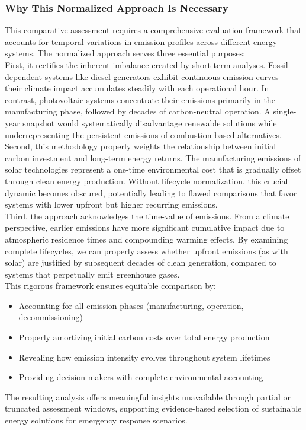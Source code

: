 \documentclass{article}
\begin{document}
\subsubsection*{Why This Normalized Approach Is Necessary}
This comparative assessment requires a comprehensive evaluation framework that accounts for temporal variations in emission profiles across different energy systems. The normalized approach serves three essential purposes:\\
First, it rectifies the inherent imbalance created by short-term analyses. Fossil-dependent systems like diesel generators exhibit continuous emission curves - their climate impact accumulates steadily with each operational hour. In contrast, photovoltaic systems concentrate their emissions primarily in the manufacturing phase, followed by decades of carbon-neutral operation. A single-year snapshot would systematically disadvantage renewable solutions while underrepresenting the persistent emissions of combustion-based alternatives. Second, this methodology properly weights the relationship between initial carbon investment and long-term energy returns. The manufacturing emissions of solar technologies represent a one-time environmental cost that is gradually offset through clean energy production. Without lifecycle normalization, this crucial dynamic becomes obscured, potentially leading to flawed comparisons that favor systems with lower upfront but higher recurring emissions.\\
Third, the approach acknowledges the time-value of emissions. From a climate perspective, earlier emissions have more significant cumulative impact due to atmospheric residence times and compounding warming effects. By examining complete lifecycles, we can properly assess whether upfront emissions (as with solar) are justified by subsequent decades of clean generation, compared to systems that perpetually emit greenhouse gases.\\[8pt]
This rigorous framework ensures equitable comparison by:
\begin{itemize}[itemsep=-1mm]
	\item Accounting for all emission phases (manufacturing, operation, decommissioning)
	\item  Properly amortizing initial carbon costs over total energy production
	\item Revealing how emission intensity evolves throughout system  lifetimes
	\item  Providing decision-makers with complete environmental accounting
\end{itemize}
The resulting analysis offers meaningful insights unavailable through partial or truncated assessment windows, supporting evidence-based selection of sustainable energy solutions for emergency response scenarios.
\end{document}
